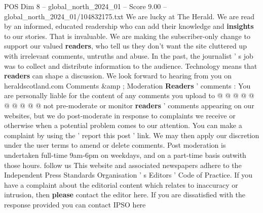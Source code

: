 \begin{textsample}{POS Dim 8 – global\_north\_2024\_01 – Score 9.00 – global\_north\_2024\_01/104832175.txt}
We are lucky at The Herald.
We are read by an informed, educated readership who can add their knowledge and \textbf{insights} to our stories.
That is invaluable.
We are making the subscriber-only change to support our valued \textbf{readers}, who tell us they don't want the site cluttered up with irrelevant comments, untruths and abuse.
In the past, the journalist ' s job was to collect and distribute information to the audience.
Technology means that \textbf{readers} can shape a discussion.
We look forward to hearing from you on heraldscotland.com Comments \&amp ; Moderation \textbf{Readers} ' comments : You are personally liable for the content of any comments you upload to @ @ @ @ @ @ @ @ @ @ not pre-moderate or monitor \textbf{readers} ' comments appearing on our websites, but we do post-moderate in response to complaints we receive or otherwise when a potential problem comes to our attention.
You can make a complaint by using the ' report this post ' link.
We may then apply our discretion under the user terms to amend or delete comments.
Post moderation is undertaken full-time 9am-6pm on weekdays, and on a part-time basis outwith those hours. follow us This website and associated newspapers adhere to the Independent Press Standards Organisation ' s Editors ' Code of Practice.
If you have a complaint about the editorial content which relates to inaccuracy or intrusion, then \textbf{please} contact the editor here.
If you are dissatisfied with the response provided you can contact IPSO here

\end{textsample}
